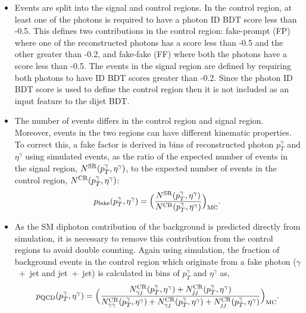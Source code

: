 \begin{itemize}
    \item Events are split into the signal and control regions. In the control region, at least one of the photons is required to have a photon ID BDT score less than -0.5. This defines two contributions in the control region: fake-prompt (FP) where one of the reconstructed photons has a score less than -0.5 and the other greater than -0.2, and fake-fake (FF) where both the photons have a score less than -0.5. The events in the signal region are defined by requiring both photons to have ID BDT scores greater than -0.2. Since the photon ID BDT score is used to define the control region then it is not included as an input feature to the dijet BDT.
    
    \item The number of events differs in the control region and signal region. Moreover, events in the two regions can have different kinematic properties. To correct this, a fake factor is derived in bins of reconstructed photon $p_T^\gamma$ and $\eta^\gamma$ using simulated events, as the ratio of the expected number of events in the signal region, $N^{\rm{SR}}(p_T^\gamma,\eta^\gamma)$, to the expected number of events in the control region, $N^{\rm{CR}}(p_T^\gamma,\eta^\gamma)$:
    \begin{equation}
        p_{\rm{fake}}(p_T^\gamma,\eta^\gamma) = \Big(\frac{N^{\rm{SR}}(p_T^\gamma,\eta^\gamma)}{N^{\rm{CR}}(p_T^\gamma,\eta^\gamma)}\Big)_{\rm{MC}}.
    \end{equation}
    
    \item As the SM diphoton contribution of the background is predicted directly from simulation, it is necessary to remove this contribution from the control regions to avoid double counting. Again using simulation, the fraction of background events in the control region which originate from a fake photon ($\gamma$~+~jet and jet~+~jet) is calculated in bins of $p_T^{\gamma}$ and $\eta^\gamma$ as,
    \begin{equation}
        p_{\rm{QCD}}(p_T^\gamma,\eta^\gamma) = \Big(\frac{N_{\gamma j}^{\rm{CR}}(p_T^\gamma,\eta^\gamma)+N_{jj}^{\rm{CR}}(p_T^\gamma,\eta^\gamma)}{N_{\gamma\gamma}^{\rm{CR}}(p_T^\gamma,\eta^\gamma)+N_{\gamma j}^{\rm{CR}}(p_T^\gamma,\eta^\gamma)+N_{jj}^{\rm{CR}}(p_T^\gamma,\eta^\gamma)}\Big)_{\rm{MC}}.
    \end{equation}    
    

\end{itemize}
